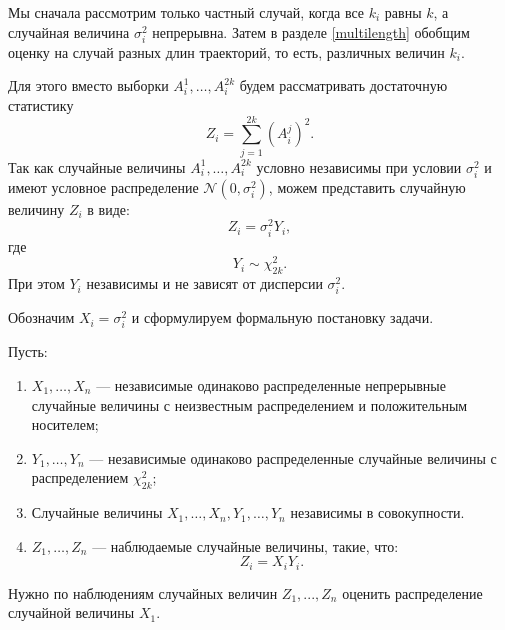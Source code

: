 \documentclass[../paper.tex]{subfiles}
\begin{document}
Мы сначала рассмотрим только частный случай,
когда все $k_i$ равны $k$, а случайная величина $\sigma_i^2$ непрерывна.
Затем в разделе \ref{multilength} обобщим оценку на случай разных длин траекторий, то есть, различных величин $k_i$.

Для этого вместо выборки $A_i^1, \dots, A_i^{2k}$ будем рассматривать
достаточную статистику 
\[
	Z_i = \sum\limits_{j=1}^{2k} \left(A_i^j\right)^2
.\]
Так как случайные величины $A_i^1, \dots, A_i^{2k}$ условно независимы при условии $\sigma_i^2$ и имеют условное
распределение $\mathcal{N}\left(0, \sigma_i^2\right)$, можем представить случайную величину $Z_i$ в виде:
\[
Z_i = \sigma_i^2 Y_i,
\]
где 
\[
Y_i \sim \chi^2_{2k}
.\]
При этом $Y_i$ независимы и не зависят от дисперсии $\sigma_i^2$.

Обозначим $X_i = \sigma_i^2$ и сформулируем формальную постановку задачи.

\begin{Probl}
	Пусть:
	\begin{enumerate}
		\item $X_1, \dots, X_n$ --- независимые одинаково распределенные непрерывные случайные величины
			с неизвестным распределением и положительным носителем; 
		\item $Y_1, \dots, Y_n$ --- независимые одинаково распределенные случайные величины с распределением $\chi^2_{2k}$;
		\item Случайные величины $X_1, \dots, X_n, Y_1, \dots, Y_n$ независимы в совокупности.
		\item $Z_1, \dots, Z_n$ --- наблюдаемые случайные величины, такие, что:
			\[
				Z_i = X_i Y_i
			.\]
	\end{enumerate}
	Нужно по наблюдениям случайных величин $Z_1, ..., Z_n$ оценить распределение случайной величины $X_1$.
\end{Probl}
\end{document}
